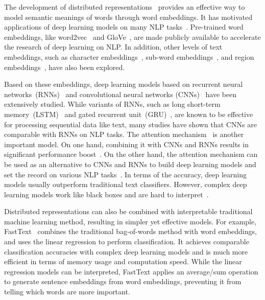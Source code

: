 \documentclass[10pt,journal,compsoc]{IEEEtran}
\begin{document}

The development of distributed
representations~\cite{mikolov2013efficient,mikolov2013distributed,mikolov2013linguistic}
provides an effective way to model semantic meanings of words through word embeddings.
It has motivated applications of deep learning models on many NLP
tasks~\cite{hochreiter1997long,sutskever2014sequence,bahdanau2014neural,bengio2003neural,collobert2011natural,mikolov2010recurrent,chung2014empirical}.
Pre-trained word embeddings, like
word2vec~\cite{mikolov2013distributed} and
GloVe~\cite{pennington2014glove}, are made publicly available to
accelerate the research of deep learning on NLP.
In addition, other levels of text embeddings, such as
character embeddings~\cite{dos2014deep,zhang2015character,conneau2017very,xiao2016efficient},
sub-word embeddings~\cite{wu2016google},
and region embeddings~\cite{johnson2015effective,qiao2018a},
have also been explored.

Based on these embeddings, deep learning models based on recurrent neural
networks~(RNNs)~\cite{tang2015document,yogatama2017generative} and
convolutional neural
networks (CNNs)~\cite{johnson2015effective,johnson2015semi,johnson2017deep,kalchbrenner2014convolutional,kim2014convolutional}
have been extensively studied. While variants of RNNs, such as long
short-term memory~(LSTM)~\cite{hochreiter1997long} and gated
recurrent unit~(GRU)~\cite{chung2014empirical}, are known to be
effective for processing sequential data like text, many studies have
shown that CNNs are comparable with RNNs on NLP tasks.
The attention mechanism~\cite{bahdanau2014neural} is another important model.
On one hand, combining it with CNNs and RNNs
results in significant performance boost~\cite{yang2016hierarchical,wu2016google}.
On the other hand, the attention mechanism can be used as an alternative to CNNs and RNNs to
build deep learning models and set the record on various NLP tasks~\cite{vaswani2017attention,devlin2018bert}.
In terms of the accuracy, deep learning models usually outperform traditional text classifiers.
However, complex deep learning models work like black boxes and are hard to interpret~\cite{rai2020explainable}.


Distributed representations can also be combined with interpretable traditional machine learning method, resulting in simpler yet effective models. For example, FastText~\cite{joulin2017bag} combines
the traditional bag-of-words method with word embeddings, and uses the linear regression to perform classification.
It achieves comparable classification accuracies with complex deep learning models and is much more efficient in terms of memory usage
and computation speed. While the linear regression models can be interpreted, FastText applies an average/sum operation
to generate sentence embeddings from word embeddings, preventing it from telling which words are more important.
\end{document}
